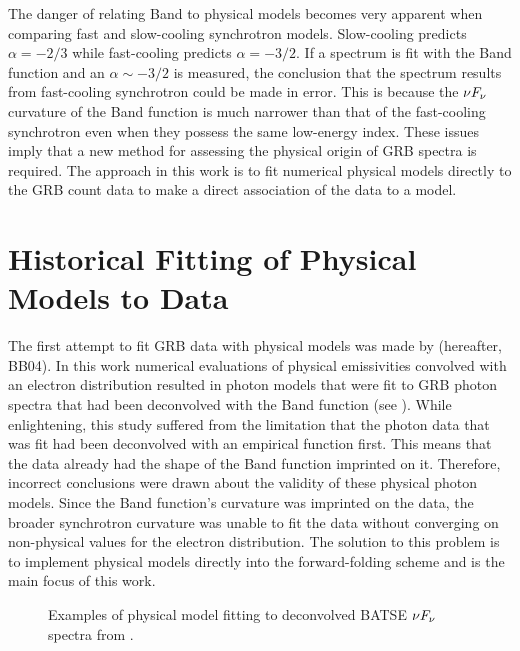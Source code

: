 The danger of relating Band to physical models becomes very apparent
when comparing fast and slow-cooling synchrotron models. Slow-cooling
predicts $\alpha=-2/3$ while fast-cooling predicts $\alpha=-3/2$. If a
spectrum is fit with the Band function and an $\alpha\sim -3/2$ is
measured, the conclusion that the spectrum results from fast-cooling
synchrotron could be made in error. This is because the $\nu F_{\nu}$
curvature of the Band function is much narrower than that of the
fast-cooling synchrotron even when they possess the same low-energy
index. These issues imply that a new method for assessing the physical
origin of GRB spectra is required. The approach in this work is to fit
numerical physical models directly to the GRB count data to make a
direct association of the data to a model.

\section{Historical Fitting of Physical Models to Data}
The first attempt to fit GRB data with physical models was made by
\cite{Baring:2004} (hereafter, BB04). In this work numerical
evaluations of physical emissivities convolved with an electron
distribution resulted in photon models that were fit to GRB photon
spectra that had been deconvolved with the Band function (see
). While enlightening, this study suffered from
the limitation that the photon data that was fit had been deconvolved
with an empirical function first. This means that the data already
had the shape of the Band function imprinted on it. Therefore,
incorrect conclusions were drawn about the validity of these physical
photon models. Since the Band function's curvature was imprinted on
the data, the broader synchrotron curvature was unable to fit the data
without converging on non-physical values for the electron
distribution. The solution to this problem is to implement physical
models directly into the forward-folding scheme and is the main focus
of this work.

\begin{figure}[h]
  \centering
  \caption{Examples of physical model fitting to deconvolved BATSE $\nu F_{\nu}$
    spectra from \cite{Baring:2004}.}
  \label{fig:bb04}
\end{figure}

